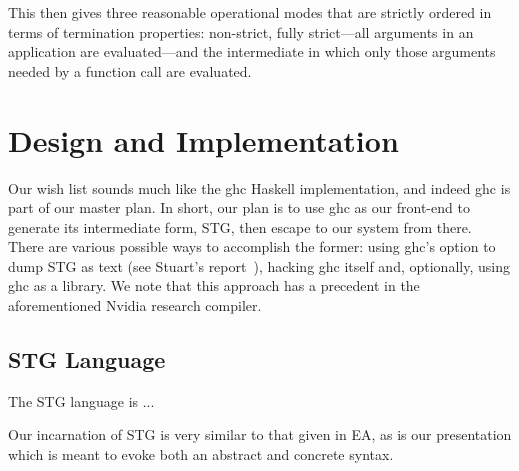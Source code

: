 \documentclass{llncs}
\begin{document}
This then gives three reasonable operational modes that are strictly ordered
in terms of termination properties: non-strict, fully strict---all arguments
in an application are evaluated---and the intermediate in which only those
arguments needed by a function call are evaluated.

\section{Design and Implementation}

Our wish list sounds much like the ghc Haskell implementation, and indeed ghc
is part of our master plan.  In short, our plan is to use ghc as our front-end
to generate its intermediate form, STG, then escape to our system from there.
There are various possible ways to accomplish the former: using ghc's option
to dump STG as text (see Stuart's report~\cite{Stuart}), hacking ghc itself
and, optionally, using ghc as a library.  We note that this approach has 
a precedent in the aforementioned Nvidia research compiler.

\subsection{STG Language}
\setlength{\tabcolsep}{5pt}

The STG language is ...

Our incarnation of STG is very similar to that given in EA, as is
our presentation which is meant to evoke both an abstract and concrete syntax.
\end{document}
